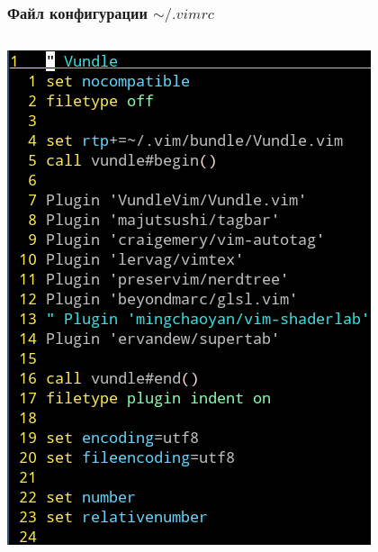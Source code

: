 \documentclass[aspectratio=169]{beamer}
\begin{document}
    \begin{frame}\frametitle{Файл конфигурации $\sim/.vimrc$}
        \begin{columns}[T,onlytextwidth]
            \begin{column}{0.24\textwidth}
                \includegraphics[width=\textwidth]{vimrc1}
            \end{column}
            \begin{column}{0.24\textwidth}

\end{column}
\end{columns}
\end{frame}
\end{document}
